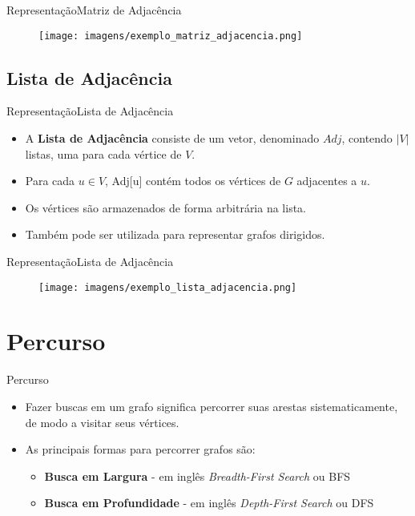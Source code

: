 \documentclass{beamer}
\begin{document}
\begin{frame}{Representação}{Matriz de Adjacência}
\begin{figure}[!h]
  \centering
  \texttt{[image: imagens/exemplo\_matriz\_adjacencia.png]}
  \label{fig_exemplo_matriz_adjacencia}
\end{figure}
\end{frame}


\subsection{Lista de Adjacência}

\begin{frame}{Representação}{Lista de Adjacência}
\begin{itemize}
\item A {\bf Lista de Adjacência} consiste de um vetor, denominado $Adj$, contendo $|V|$ listas, uma para cada vértice de $V$.
\item Para cada $u \in V$, Adj[u] contém todos os vértices de $G$ adjacentes a $u$.
\item Os vértices são armazenados de forma arbitrária na lista.
\item Também pode ser utilizada para representar grafos dirigidos.
\end{itemize}
\end{frame}


\begin{frame}{Representação}{Lista de Adjacência}
\begin{figure}[!h]
  \centering
  \texttt{[image: imagens/exemplo\_lista\_adjacencia.png]}
  \label{fig_exemplo_lista_adjacencia}
\end{figure}
\end{frame}

\section{Percurso}

\begin{frame}{Percurso}
\begin{itemize}
\item Fazer buscas em um grafo significa percorrer suas arestas sistematicamente, de modo a visitar seus vértices.
\item As principais formas para percorrer grafos são:
\begin{itemize}
\item {\bf Busca em Largura} - em inglês {\it Breadth-First Search} ou BFS
\item {\bf Busca em Profundidade} - em inglês {\it Depth-First Search} ou DFS
\end{itemize}
\end{itemize}
\end{frame}
\end{document}
